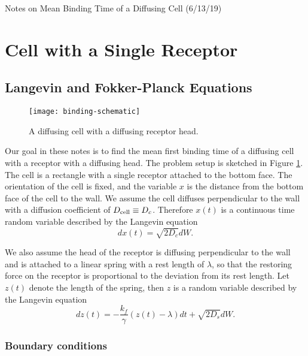 \documentclass{article}
\newcommand{\tn}{\textnormal}
\newcommand{\stiff}{\frac{k_f}{\gamma}}
\begin{document}
\pagestyle{plain}

\begin{center}
  {\Large Notes on Mean Binding Time of a Diffusing Cell (6/13/19)}
\end{center}

\section{Cell with a Single Receptor}
\label{sec:cell-with-single}

\subsection{Langevin and Fokker-Planck Equations}
\label{sec:lang-fokk-planck}

\begin{figure}[h]
  \centering
  \texttt{[image: binding-schematic]}
  \caption{A diffusing cell with a diffusing receptor head.}
  \label{fig:binding-schematic}
\end{figure}

Our goal in these notes is to find the mean first binding time of a
diffusing cell with a receptor with a diffusing head. The problem
setup is sketched in Figure \ref{fig:binding-schematic}. The cell is a
rectangle with a single receptor attached to the bottom face. The
orientation of the cell is fixed, and the variable $x$ is the distance
from the bottom face of the cell to the wall. We assume the cell
diffuses perpendicular to the wall with a diffusion coefficient of
$D_\tn{cell} \equiv D_c$. Therefore $x(t)$ is a continuous time random
variable described by the Langevin equation
\begin{equation}
  dx(t) = \sqrt{2D_c}dW.
  \label{eq:lang-x}
\end{equation}

We also assume the head of the receptor is diffusing perpendicular to
the wall and is attached to a linear spring with a rest length of
$\lambda$, so that the restoring force on the receptor is proportional
to the deviation from its rest length. Let $z(t)$ denote the length of
the spring, then $z$ is a random variable described by the Langevin
equation
\begin{equation}
  dz(t) = -\stiff (z(t) - \lambda) dt + \sqrt{2D_s} dW.
  \label{eq:lang-z}
\end{equation}

\subsubsection{Boundary conditions}
\label{sec:boundary-conditions}
\end{document}
